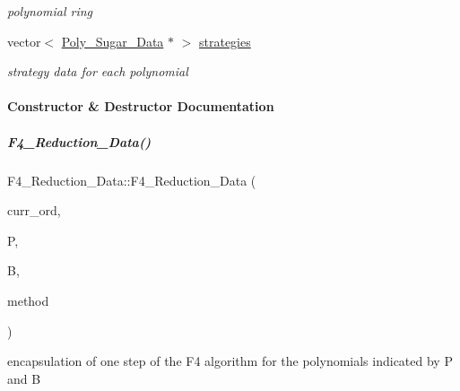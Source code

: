 \begin{DoxyCompactItemize}
\begin{DoxyCompactList}\small\item\em polynomial ring \end{DoxyCompactList}\item 
\mbox{\label{group___g_b_computation_a7536f2bbcdcfcadd45c209694c31e3a4}} 
vector$<$ \hyperlink{group__strategygroup_class_poly___sugar___data}{Poly\+\_\+\+Sugar\+\_\+\+Data} $\ast$ $>$ \hyperlink{group___g_b_computation_a7536f2bbcdcfcadd45c209694c31e3a4}{strategies}
\begin{DoxyCompactList}\small\item\em strategy data for each polynomial \end{DoxyCompactList}\end{DoxyCompactItemize}


\paragraph{Constructor \& Destructor Documentation}
\mbox{\label{group___g_b_computation_a41791d20f96fc7310a40a8e4c63aa4ef}} 
\subparagraph{\texorpdfstring{F4\+\_\+\+Reduction\+\_\+\+Data()}{F4\_Reduction\_Data()}\hspace{0.1cm}{\footnotesize\ttfamily [1/2]}}
{\footnotesize\ttfamily F4\+\_\+\+Reduction\+\_\+\+Data\+::\+F4\+\_\+\+Reduction\+\_\+\+Data (\begin{DoxyParamCaption}\item[{const \hyperlink{group__orderinggroup_class_w_grevlex}{W\+Grevlex} $\ast$}]{curr\+\_\+ord,  }\item[{const list$<$ \hyperlink{group___g_b_computation_class_critical___pair___dynamic}{Critical\+\_\+\+Pair\+\_\+\+Dynamic} $\ast$$>$ \&}]{P,  }\item[{const list$<$ \hyperlink{group__polygroup_class_abstract___polynomial}{Abstract\+\_\+\+Polynomial} $\ast$$>$ \&}]{B,  }\item[{Dynamic\+\_\+\+Heuristic}]{method }\end{DoxyParamCaption})}



encapsulation of one step of the F4 algorithm for the polynomials indicated by {\ttfamily P} and {\ttfamily B} 


